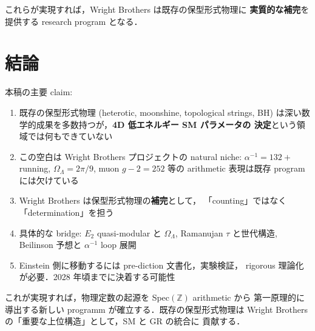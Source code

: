 \documentclass[11pt,a4paper]{article}
\begin{document}
これらが実現すれば，Wright Brothers は既存の保型形式物理に
\textbf{実質的な補完}を提供する research program となる．

\section{結論}

本稿の主要 claim:

\begin{enumerate}
\item 既存の保型形式物理 (heterotic, moonshine, topological strings, BH)
は深い数学的成果を多数持つが，\textbf{4D 低エネルギー SM パラメータの
決定}という領域では何もできていない
\item この空白は Wright Brothers プロジェクトの natural niche:
$\alpha^{-1} = 132 + $ running, $\Omega_\Lambda = 2\pi/9$, muon $g-2 = 252$
等の arithmetic 表現は既存 program には欠けている
\item Wright Brothers は保型形式物理の\textbf{補完}として，
「counting」ではなく「determination」を担う
\item 具体的な bridge: $E_2$ quasi-modular と $\Omega_\Lambda$,
Ramanujan $\tau$ と世代構造, Beilinson 予想と $\alpha^{-1}$ loop 展開
\item Einstein 側に移動するには pre-diction 文書化，実験検証，
rigorous 理論化が必要．2028 年頃までに決着する可能性
\end{enumerate}

これが実現すれば，物理定数の起源を Spec$(\mathbb{Z})$ arithmetic から
第一原理的に導出する新しい programm が確立する．既存の保型形式物理は
Wright Brothers の「重要な上位構造」として，SM と GR の統合に
貢献する．
\end{document}
